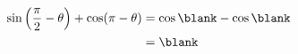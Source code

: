 $\begin{aligned}\sin\left(\dfrac{\pi}{2}-\theta\right)+\cos(\pi-\theta)&=\cos\blank-\cos\blank\\ &=\blank\end{aligned}$

